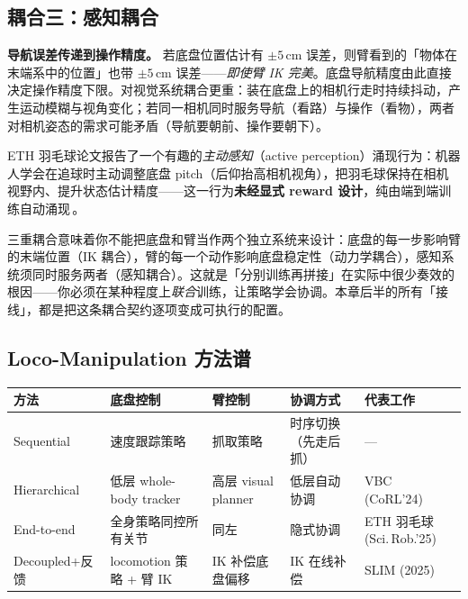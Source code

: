 \subsection{耦合三：感知耦合}
\label{sec:rlmc-lm-perccoupling}

\textbf{导航误差传递到操作精度。} 若底盘位置估计有 $\pm5\,$cm 误差，则臂看到的「物体在末端系中的位置」也带 $\pm5\,$cm 误差——\emph{即使臂 IK 完美}。底盘导航精度由此直接决定操作精度下限。对视觉系统耦合更重：装在底盘上的相机行走时持续抖动，产生运动模糊与视角变化；若同一相机同时服务导航（看路）与操作（看物），两者对相机姿态的需求可能矛盾（导航要朝前、操作要朝下）。

ETH 羽毛球论文报告了一个有趣的\emph{主动感知}（active perception）涌现行为：机器人学会在追球时主动调整底盘 pitch（后仰抬高相机视角），把羽毛球保持在相机视野内、提升状态估计精度——这一行为\textbf{未经显式 reward 设计}，纯由端到端训练自动涌现\,\cite{ma2025badminton}。

\begin{insight}[移动操作的三重耦合 = 一个整体系统]\label{ins:rlmc-lm-onesystem}
三重耦合意味着你不能把底盘和臂当作两个独立系统来设计：底盘的每一步影响臂的末端位置（IK 耦合），臂的每一个动作影响底盘稳定性（动力学耦合），感知系统须同时服务两者（感知耦合）。这就是「分别训练再拼接」在实际中很少奏效的根因——你必须在某种程度上\emph{联合}训练，让策略学会协调。本章后半的所有「接线」，都是把这条耦合契约逐项变成可执行的配置。
\end{insight}

\subsection{Loco-Manipulation 方法谱}
\label{sec:rlmc-lm-spectrum}

\begin{center}
\small
\begin{tabular}{@{}lllll@{}}
\toprule
方法 & 底盘控制 & 臂控制 & 协调方式 & 代表工作 \\
\midrule
Sequential & 速度跟踪策略 & 抓取策略 & 时序切换（先走后抓） & --- \\
Hierarchical & 低层 whole-body tracker & 高层 visual planner & 低层自动协调 & VBC (CoRL'24) \\
End-to-end & 全身策略同控所有关节 & 同左 & 隐式协调 & ETH 羽毛球 (Sci.\,Rob.'25) \\
Decoupled+反馈 & locomotion 策略 + 臂 IK & IK 补偿底盘偏移 & IK 在线补偿 & SLIM (2025) \\
\bottomrule
\end{tabular}
\end{center}

